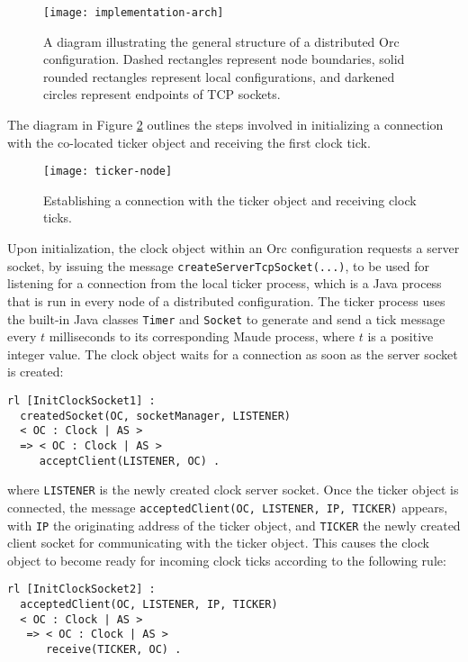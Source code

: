 \documentclass{eptcs}
\begin{document}
\begin{figure} 	
	\centering
	\texttt{[image: implementation-arch]}
	\caption{A diagram illustrating the general structure of a distributed Orc configuration. Dashed rectangles represent node boundaries, solid rounded rectangles represent local configurations, and darkened circles represent endpoints of TCP sockets.}
    \label{fig:dist-orc-conf}
\end{figure}


The diagram in Figure \ref{fig:ticker-node} outlines the steps involved in initializing a connection with the co-located ticker object and receiving the first clock tick.

\begin{figure} 	
	\centering
	\texttt{[image: ticker-node]}
	\caption{Establishing a connection with the ticker object and receiving clock ticks.}
    \label{fig:ticker-node}
\end{figure}


Upon initialization, the clock object within an Orc configuration requests a server socket, by issuing the message \texttt{createServerTcpSocket(...)}, to be used for listening for a connection from the local ticker process, which is a Java process that is run in every node of a distributed configuration. The ticker process uses the built-in Java classes \texttt{Timer} and \texttt{Socket} to generate and send a tick message every $t$ milliseconds to its corresponding Maude process, where $t$ is a positive integer value. The clock object waits for a connection as soon as the server socket is created:

\begin{small}
\begin{verbatim}
rl [InitClockSocket1] :
  createdSocket(OC, socketManager, LISTENER)
  < OC : Clock | AS >  
  => < OC : Clock | AS > 
     acceptClient(LISTENER, OC) .
\end{verbatim}
\end{small}

\noindent where \texttt{LISTENER} is the newly created clock server socket. 
Once the ticker object is connected, the message \texttt{acceptedClient(OC, LISTENER, IP, TICKER)} appears, with \texttt{IP} the originating address of the ticker object, and \texttt{TICKER} the newly created client socket for communicating with the ticker object. This causes the clock object to become ready for incoming clock ticks according to the following rule:

\begin{small}
\begin{verbatim}
rl [InitClockSocket2] : 
  acceptedClient(OC, LISTENER, IP, TICKER)
  < OC : Clock | AS >  
   => < OC : Clock | AS > 
      receive(TICKER, OC) .
\end{verbatim}
\end{small}
\end{document}
